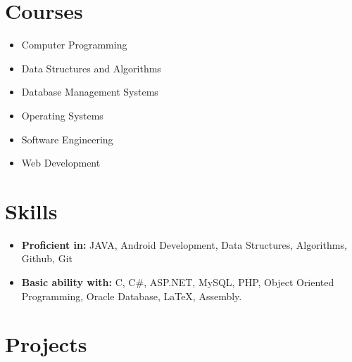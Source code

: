 \documentclass[11pt,a4paper,sans]{moderncv}        %
\begin{document}
\section{Courses}
\vspace{6pt}
\begin{itemize}
\item Computer Programming\vspace{4pt}
\item Data Structures and Algorithms \vspace{4pt}
\item Database Management Systems\vspace{4pt}
\item Operating Systems\vspace{4pt}
\item Software Engineering\vspace{4pt}
\item Web Development\vspace{6pt}
\end{itemize}
 		

\section{Skills}
\vspace{6pt}
\begin{itemize}
\item \textbf{Proficient in:} JAVA, Android Development, Data Structures, Algorithms, Github, Git\vspace{4pt}
\item \textbf{Basic ability with:} C, C\#, ASP.NET, MySQL, PHP, Object Oriented Programming,  Oracle Database, LaTeX, Assembly.

\vspace{6pt}
\end{itemize} 		


\section{Projects}
\vspace{6pt}
\end{document}
